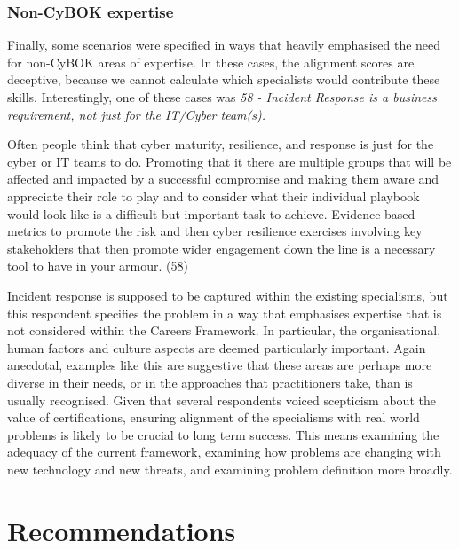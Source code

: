 \documentclass[
  a4paper,
]{book}
\begin{document}
\subsubsection{Non-CyBOK expertise}\label{non-cybok-expertise}

Finally, some scenarios were specified in ways that heavily emphasised
the need for non-CyBOK areas of expertise. In these cases, the alignment
scores are deceptive, because we cannot calculate which specialists
would contribute these skills. Interestingly, one of these cases was
\emph{58 - Incident Response is a business requirement, not just for the
IT/Cyber team(s).}

\begin{tcolorbox}[enhanced jigsaw, leftrule=.75mm, colframe=quarto-callout-note-color-frame, opacityback=0, breakable, left=2mm, rightrule=.15mm, bottomrule=.15mm, colback=white, arc=.35mm, toprule=.15mm]

Often people think that cyber maturity, resilience, and response is just
for the cyber or IT teams to do. Promoting that it there are multiple
groups that will be affected and impacted by a successful compromise and
making them aware and appreciate their role to play and to consider what
their individual playbook would look like is a difficult but important
task to achieve. Evidence based metrics to promote the risk and then
cyber resilience exercises involving key stakeholders that then promote
wider engagement down the line is a necessary tool to have in your
armour. (58)

\end{tcolorbox}

Incident response is supposed to be captured within the existing
specialisms, but this respondent specifies the problem in a way that
emphasises expertise that is not considered within the Careers
Framework. In particular, the organisational, human factors and culture
aspects are deemed particularly important. Again anecdotal, examples
like this are suggestive that these areas are perhaps more diverse in
their needs, or in the approaches that practitioners take, than is
usually recognised. Given that several respondents voiced scepticism
about the value of certifications, ensuring alignment of the specialisms
with real world problems is likely to be crucial to long term success.
This means examining the adequacy of the current framework, examining
how problems are changing with new technology and new threats, and
examining problem definition more broadly.

\section{Recommendations}\label{recommendations-3}
\end{document}
